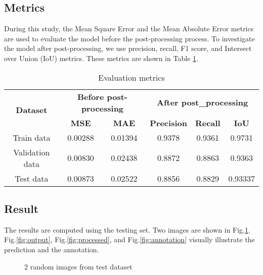 \documentclass{article}
\begin{document}
\subsection{Metrics}
During this study, the Mean Square Error and the Mean Absolute Error metrics are used to evaluate the model before the post-processing process. To investigate the model after post-processing, we use precision, recall, F1 score, and Intersect over Union (IoU) metrics. These metrics are shown in Table \ref{tab:metrics}.
\begin{table}[!hbt]
\centering
\caption{Evaluation metrics}
\begin{tabular}{|c|cc|ccc|}
\hline
\multirow{2}{*}{\textbf{Dataset}} & \multicolumn{2}{c|}{\textbf{Before post-processing}} & \multicolumn{3}{c|}{\textbf{After post\_processing}}                                          \\ \cline{2-6} 
                                  & \multicolumn{1}{c|}{\textbf{MSE}}   & \textbf{MAE}   & \multicolumn{1}{c|}{\textbf{Precision}} & \multicolumn{1}{c|}{\textbf{Recall}} & \textbf{IoU} \\ \hline
Train data                        & \multicolumn{1}{c|}{0.00288}        & 0.01394        & \multicolumn{1}{c|}{0.9378}             & \multicolumn{1}{c|}{0.9361}          & 0.9731       \\ \hline
Validation data                   & \multicolumn{1}{c|}{0.00830}        & 0.02438        & \multicolumn{1}{c|}{0.8872}             & \multicolumn{1}{c|}{0.8863}          & 0.9363       \\ \hline
Test data                         & \multicolumn{1}{c|}{0.00873}        & 0.02522        & \multicolumn{1}{c|}{0.8856}             & \multicolumn{1}{c|}{0.8829}          & 0.93337      \\ \hline
\end{tabular}
\label{tab:metrics}
\end{table}
\subsection{Result}
The results are computed using the testing set. Two images are shown in Fig.\ref{fig:original}. Fig.\ref{fig:output}, Fig.\ref{fig:processed}, and Fig.\ref{fig:annotation} visually illustrate the prediction and the annotation.
\begin{figure}[hbt!]%
    \centering
    \qquad
    \caption{2 random images from test dataset}%
    \label{fig:original}%
\end{figure}
\end{document}
